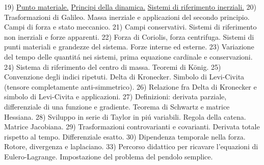 \begin{multicols}{3}
  19)
  \href{https://it.wikipedia.org/wiki/Punto_materiale}
  {Punto materiale.}
  \href{https://it.wikipedia.org/wiki/Principi_della_dinamica}
  {Principi della dinamica.}
  \href{https://it.wikipedia.org/wiki/Sistema_di_riferimento_inerziale}
  {Sistemi di riferimento inerziali.}
  20) Trasformazioni di Galileo. Massa inerziale e applicazioni del secondo
  principio. Campi di forza e stato meccanico.
  21) Campi conservativi. Sistemi di riferimento non inerziali e forze
  apparenti.
  22) Forza di Coriolis, forza centrifuga. Sistemi di punti materiali e
  grandezze del sistema. Forze interne ed esterne.
  23) Variazione del tempo delle quantit\'a nei sistemi, prima equazione
  cardinale e conservazioni.
  24) Sistema di riferimento del centro di massa. Teoremi di K\"onig.
  25) Convenzione degli indici ripetuti. Delta di Kronecker. Simbolo di
  Levi-Civita (tensore completamente anti-simmetrico).
  26) Relazione fra Delta di Kronecker e simbolo di Levi-Civita e applicazioni.
  27) Definizioni: derivata parziale, differenziale di una funzione e
  gradiente. Teorema di Schwartz e matrice Hessiana.
  28) Sviluppo in serie di Taylor in pi\'u variabili. Regola della catena.
  Matrice Jacobiana.
  29) Trasformazioni controvarianti e covarianti. Derivata totale rispetto al
  tempo. Differenziale esatto.
  30) Dipendenza temporale nella forza. Rotore, divergenza e laplaciano.
  33) Percorso didattico per ricavare l'equazioni di Eulero-Lagrange.
  Impostazione del problema del pendolo semplice.

\end{multicols}
